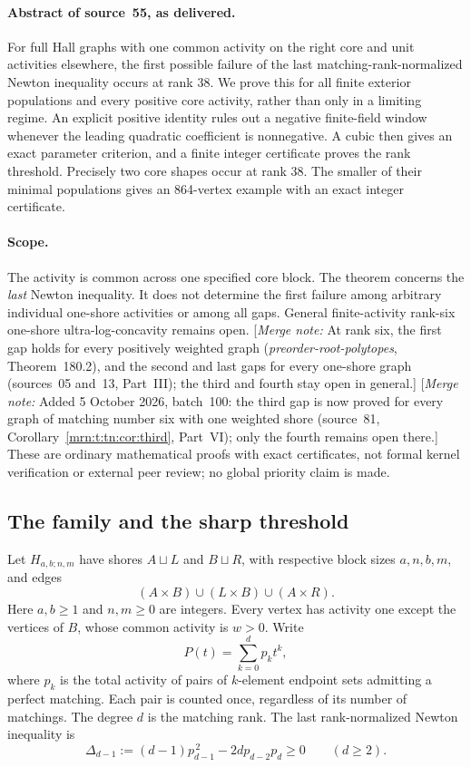 \documentclass[11pt,a4paper]{article}
\theoremstyle{remark}\newtheorem{remark}[theorem]{Remark}
\newcommand{\mnote}[1]{[\textit{Merge note:} #1]}
\newcommand{\prp}{\emph{preorder-root-polytopes}}
\begin{document}
\paragraph{Abstract of source~55, as delivered.} For full Hall graphs with one common activity on the right core and unit activities elsewhere, the first possible failure of the last matching-rank-normalized Newton inequality occurs at rank 38. We prove this for all finite exterior populations and every positive core activity, rather than only in a limiting regime. An explicit positive identity rules out a negative finite-field window whenever the leading quadratic coefficient is nonnegative. A cubic then gives an exact parameter criterion, and a finite integer certificate proves the rank threshold. Precisely two core shapes occur at rank 38. The smaller of their minimal populations gives an 864-vertex example with an exact integer certificate.

\paragraph{Scope.}
The activity is common across one specified core block. The theorem concerns the \emph{last} Newton inequality. It does not determine the first failure among arbitrary individual one-shore activities or among all gaps. General finite-activity rank-six one-shore ultra-log-concavity remains open. \mnote{At rank six, the first gap holds for every positively weighted graph (\prp, Theorem~180.2), and the second and last gaps for every one-shore graph (sources~05 and~13, Part~III); the third and fourth stay open in general.} \mnote{Added 5 October 2026, batch~100: the third gap is now proved for every graph of matching number six with one weighted shore (source~81, Corollary~\ref{mrn:t:tn:cor:third}, Part~VI); only the fourth remains open there.} These are ordinary mathematical proofs with exact certificates, not formal kernel verification or external peer review; no global priority claim is made.

\subsection{The family and the sharp threshold}
Let $H_{a,b;n,m}$ have shores $A\sqcup L$ and $B\sqcup R$, with respective block sizes $a,n,b,m$, and edges
\[
 (A\times B)\cup(L\times B)\cup(A\times R).
\]
Here $a,b\ge1$ and $n,m\ge0$ are integers. Every vertex has activity one except the vertices of $B$, whose common activity is $w>0$. Write
\[
 P(t)=\sum_{k=0}^{d}p_kt^k,
\]
where $p_k$ is the total activity of pairs of $k$-element endpoint sets admitting a perfect matching. Each pair is counted once, regardless of its number of matchings. The degree $d$ is the matching rank. The last rank-normalized Newton inequality is
\begin{equation}\label{mrn:u:ep:eq:last}
 \Delta_{d-1}:=(d-1)p_{d-1}^{\,2}-2d p_{d-2}p_d\ge0
 \qquad(d\ge2).
\end{equation}
\end{document}
